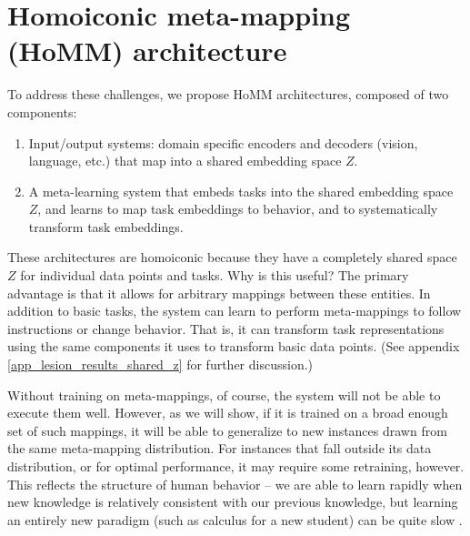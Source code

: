 \documentclass{article}
\begin{document}
\vspace{-0.25em}
\section{Homoiconic meta-mapping (HoMM) architecture}
\vspace{-0.5em} %
To address these challenges, we propose HoMM architectures, composed of two components: 
\vspace{-1em}
\begin{enumerate} \setlength \itemsep{0em}
\item Input/output systems: domain specific encoders and decoders (vision, language, etc.) that map into a shared embedding space $Z$.
\item A meta-learning system that embeds tasks into the shared embedding space $Z$, and learns to map task embeddings to behavior, and to systematically transform task embeddings.
\end{enumerate}
\vspace{-0.75em}
These architectures are homoiconic because they have a completely shared space $Z$ for individual data points and tasks. Why is this useful? The primary advantage is that it allows for arbitrary mappings between these entities. In addition to basic tasks, the system can learn to perform meta-mappings to follow instructions or change behavior. That is, it can transform task representations using the same components it uses to transform basic data points. (See appendix \ref{app_lesion_results_shared_z} for further discussion.) \par
Without training on meta-mappings, of course, the system will not be able to execute them well. However, as we will show, if it is trained on a broad enough set of such mappings, it will be able to generalize to new instances drawn from the same meta-mapping distribution. For instances that fall outside its data distribution, or for optimal performance, it may require some retraining, however. This reflects the structure of human behavior -- we are able to learn rapidly when new knowledge is relatively consistent with our previous knowledge, but learning an entirely new paradigm (such as calculus for a new student) can be quite slow \citep[cf.][]{Kumaran2016, Botvinick2019}. \par 
\end{document}
